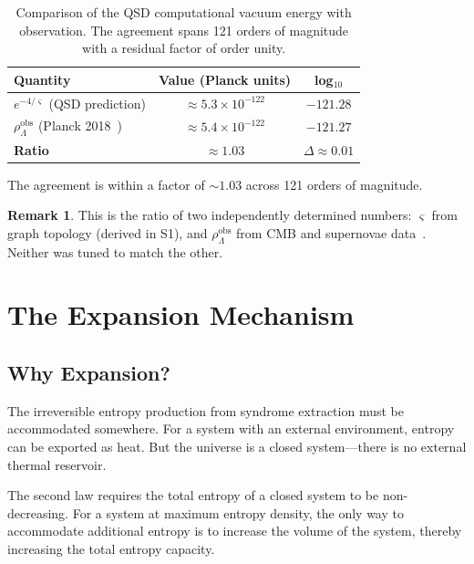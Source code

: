 \documentclass[11pt,a4paper]{article}
\theoremstyle{definition}
\newtheorem{remark}[theorem]{Remark}
\newcommand{\strain}{\varsigma}            %
\newcommand{\rhoL}{\rho_{\Lambda}}
\begin{document}
\begin{table}[h]
\centering
\begin{tabular}{lcc}
\toprule
\textbf{Quantity} & \textbf{Value (Planck units)} & \textbf{log$_{10}$} \\
\midrule
$e^{-4/\strain}$ (QSD prediction) & $\approx 5.3 \times 10^{-122}$ & $-121.28$ \\
$\rhoL^{\text{obs}}$ (Planck 2018~\cite{Planck2018}) & $\approx 5.4 \times 10^{-122}$ & $-121.27$ \\
\midrule
\textbf{Ratio} & $\approx 1.03$ & $\Delta \approx 0.01$ \\
\bottomrule
\end{tabular}
\caption{Comparison of the QSD computational vacuum energy with observation. The agreement spans 121 orders of magnitude with a residual factor of order unity.}
\end{table}

The agreement is within a factor of $\sim 1.03$ across 121 orders of magnitude.

\begin{remark}
This is the ratio of two independently determined numbers: $\strain$ from graph topology (derived in S1), and $\rhoL^{\text{obs}}$ from CMB and supernovae data~\cite{Planck2018,Perlmutter1999,Riess1998}. Neither was tuned to match the other.
\end{remark}


\section{The Expansion Mechanism}

\subsection{Why Expansion?}

The irreversible entropy production from syndrome extraction must be accommodated somewhere. For a system with an external environment, entropy can be exported as heat. But the universe is a closed system---there is no external thermal reservoir.

The second law requires the total entropy of a closed system to be non-decreasing. For a system at maximum entropy density, the only way to accommodate additional entropy is to increase the volume of the system, thereby increasing the total entropy capacity.
\end{document}
